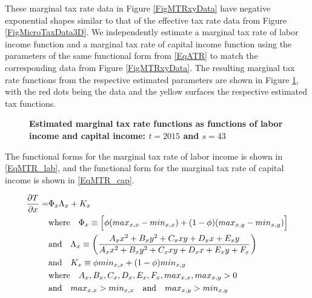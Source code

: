 \documentclass[letterpaper,12pt]{article}
\theoremstyle{definition}
\begin{document}
\begin{spacing}{1.5}
    These marginal tax rate data in Figure \ref{FigMTRxyData} have negative exponential shapes similar to that of the effective tax rate data from Figure \ref{FigMicroTaxData3D}. We independently estimate a marginal tax rate of labor income function and a marginal tax rate of capital income function using the parameters of the same functional form from \eqref{EqATR} to match the corresponding data from Figure \ref{FigMTRxyData}. The resulting marginal tax rate functions from the respective estimated parameters are shown in Figure \ref{FigMTRxyEst}, with the red dots being the data and the yellow surfaces the respective estimated tax functions.

    \begin{figure}[htbp]\centering \captionsetup{width=6.0in}
      \caption{\label{FigMTRxyEst}\textbf{Estimated marginal tax rate functions as functions of labor income and capital income: $t=2015$ and $s=43$}}
    \end{figure}

    The functional forms for the marginal tax rate of labor income is shown in \eqref{EqMTR_lab}, and the functional form for the marginal tax rate of capital income is shown in \eqref{EqMTR_cap}.

    \begin{equation}\label{EqMTR_lab}
      \begin{split}
       \frac{\partial T}{\partial x} = &\Phi_x\Lambda_x + K_x \\
        &\text{where}\quad \Phi_x \equiv \Bigl[\phi(max_{x,x} - min_{x,x}) + (1 - \phi)(max_{x,y} - min_{x,y})\Bigr] \\
        &\text{and}\quad \Lambda_x \equiv \biggl(\frac{A_x x^2 + B_x y^2 + C_x xy + D_x x + E_x y}{A_x x^2 + B_x y^2 + C_x xy + D_x x + E_x y + F_x}\biggr) \\
        &\text{and}\quad K_x \equiv \phi min_{x,x} + (1 - \phi)min_{x,y} \\
        &\text{where}\quad A_x,B_x,C_x,D_x,E_x,F_x,max_{x,x},max_{x,y} > 0 \\
        &\text{and}\quad max_{x,x} > min_{x,x} \quad\text{and}\quad max_{x,y} > min_{x,y}
      \end{split}
    \end{equation}


\end{spacing}
\end{document}
